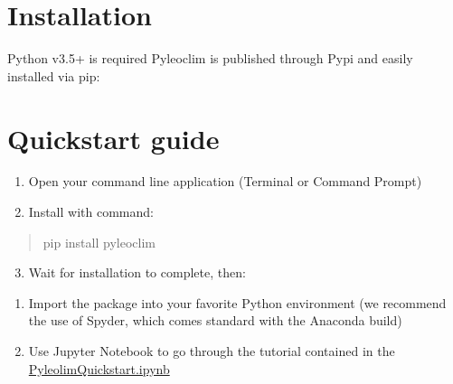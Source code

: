 \documentclass[letterpaper,10pt,english]{sphinxmanual}
\begin{document}
\section{Installation}
\label{\detokenize{Introduction:installation}}
Python v3.5+ is required
Pyleoclim is published through Pypi and easily installed via pip:

\begin{sphinxVerbatim}[commandchars=\\\{\}]
  
\end{sphinxVerbatim}


\section{Quickstart guide}
\label{\detokenize{Introduction:quickstart-guide}}\begin{enumerate}
\item {} 
Open your command line application (Terminal or Command Prompt)

\item {} 
Install with command:

\end{enumerate}
\begin{quote}

pip install pyleoclim
\end{quote}
\begin{enumerate}
\setcounter{enumi}{2}
\item {} 
Wait for installation to complete, then:

\end{enumerate}
\begin{enumerate}
\item {} 
Import the package into your favorite Python environment (we recommend the use of Spyder, which comes standard with the Anaconda build)

\item {} 
Use Jupyter Notebook to go through the tutorial contained in the \href{https://github.com/LinkedEarth/Pyleoclim\_util/tree/master/Example}{PyleolimQuickstart.ipynb}

\end{enumerate}
\end{document}
